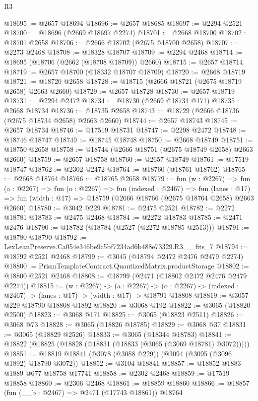 \begin{lexlean}{R3}
\begin{coremodule}
@18695 := @2657 @18694
@18696 := @2657 @18685
@18697 := @2294 @2521
@18700 := @18696 (@2669 @18697 @2274)
@18701 := @2668 @18700
@18702 := @18701 @2658
@18706 := @2666 @18702 (@2675 @18700 @2658)
@18707 := @2273 @2468
@18708 := @18328 @18707
@18709 := @2294 @2468
@18714 := @18695 (@18706 (@2662 (@18708 @18709)) @2660)
@18715 := @2657 @18714
@18719 := @2657 @18700 (@18332 @18707 @18709)
@18720 := @2668 @18719
@18721 := @18720 @2658
@18728 := @18715 (@2666 @18721 (@2675 @18719 @2658) @2663 @2660)
@18729 := @2657 @18728
@18730 := @2657 @18719
@18731 := @2294 @2472
@18734 := @18730 (@2669 @18731 @171)
@18735 := @2668 @18734
@18736 := @18735 @2658
@18743 := @18729 (@2666 @18736 (@2675 @18734 @2658) @2663 @2660)
@18744 := @2657 @18743
@18745 := @2657 @18734
@18746 := @17519 @18731
@18747 := @2298 @2472
@18748 := @18746 @18747
@18749 := @18745 @18748
@18750 := @2668 @18749
@18751 := @18750 @2658
@18758 := @18744 (@2666 @18751 (@2675 @18749 @2658) @2663 @2660)
@18759 := @2657 @18758
@18760 := @2657 @18749
@18761 := @17519 @18747
@18762 := @2302 @2472
@18764 := @18760 (@18761 @18762)
@18765 := @2668 @18764
@18766 := @18765 @2658
@18779 := fun (w : @2267) =>
  fun (a : @2267) =>
  fun (o : @2267) =>
  fun (indexed : @2467) =>
  fun (lanes : @17) => fun (width : @17) => @18759 (@2666 @18766 (@2675 @18764 @2658) @2663 @2660)
@18780 := @3042 @229
@18781 := @2475 @2521
@18782 := @2272 @18781
@18783 := @2475 @2468
@18784 := @2272 @18783
@18785 := @2471 @2476
@18790 := @18782 (@18784 (@2527 (@2272 @18785 @2513)))
@18791 := @18780 @18790
@18792 := LexLeanPreserve.Ca054e346be9c5bf7234ad6b488e73329.R3.__fits_7
@18794 := @18792 @2521 @2468
@18799 := @3045 (@18794 @2472 @2476 @2479 @2274)
@18800 := PrismTemplateContract.QuantizedMatrix.productStorage
@18802 := @18800 @2521 @2468
@18808 := @18799 (@2471 (@18802 @2472 @2476 @2479 @2274))
@18815 := (w : @2267) ->
  (a : @2267) -> (o : @2267) -> (indexed : @2467) -> (lanes : @17) -> (width : @17) -> @18791 @18808
@18819 := @3057 @229 @18790 @18808 @1892
@18820 := @3068 @192
@18822 := @3065 (@18820 @2500)
@18823 := @3068 @171
@18825 := @3065 (@18823 @2511)
@18826 := @3068 @73
@18828 := @3065 (@18826 @18785)
@18829 := @3068 @37
@18831 := @3065 (@18829 @2526)
@18833 := @3065 (@18344 @18783)
@18841 := @18822 (@18825 (@18828 (@18831 (@18833 (@3065 (@3069 @18781) @3072)))))
@18851 := @18819 @18841 (@3078 (@3088 @229)) (@3094 (@3095 (@3096 @1892) @18790 @3072))
@18852 := @3104 @18841
@18857 := @18852 @1883 @1889 @677 @18758 @17741
@18858 := @2302 @2468
@18859 := @17519 @18858
@18860 := @2306 @2468
@18861 := @18859 @18860
@18866 := @18857 (fun (__b : @2467) => @2471 (@17743 @18861)) @18764

\end{coremodule}
\end{lexlean}

